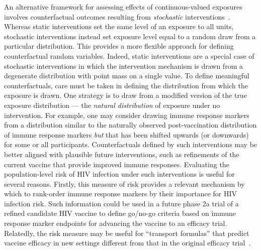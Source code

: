 An alternative framework for assessing effects of continuous-valued exposures
involves counterfactual outcomes resulting from \textit{stochastic}
interventions~\citep{diaz2012population, haneuse2013estimation}. Whereas static
interventions set the same level of an exposure to all units, stochastic
interventions instead set exposure level equal to a random draw from
a particular distribution. This provides a more flexible approach for defining
counterfactual random variables. Indeed, static interventions are a special case
of stochastic interventions in which the intervention mechanism is drawn from
a degenerate distribution with point mass on a single value. To define
meaningful counterfactuals, care must be taken in defining the distribution from
which the exposure is drawn. One strategy is to draw from a modified version of
the true exposure distribution --- the \emph{natural distribution} of exposure
under no intervention. For example, one may consider drawing immune response
markers from a distribution similar to the naturally observed post-vaccination
distribution of immune response markers \emph{but} that has been shifted upwards
(or downwards) for some or all participants. Counterfactuals defined by such
interventions may be better aligned with plausible future interventions, such as
refinements of the current vaccine that provide improved immune responses.
Evaluating the population-level risk of HIV infection under such interventions
is useful for several reasons. Firstly, this measure of risk provides a relevant
mechanism by which to rank-order immune response markers by their importance for
HIV infection risk. Such information could be used in a future phase 2a trial of
a refined candidate HIV vaccine to define  go/no-go criteria based on immune
response marker endpoints for advancing the vaccine to an efficacy trial.
Relatedly, the risk measure may be useful for ``transport formulas'' that
predict vaccine efficacy in new settings different from that in the original
efficacy trial~\citep{pearl2014external}.

